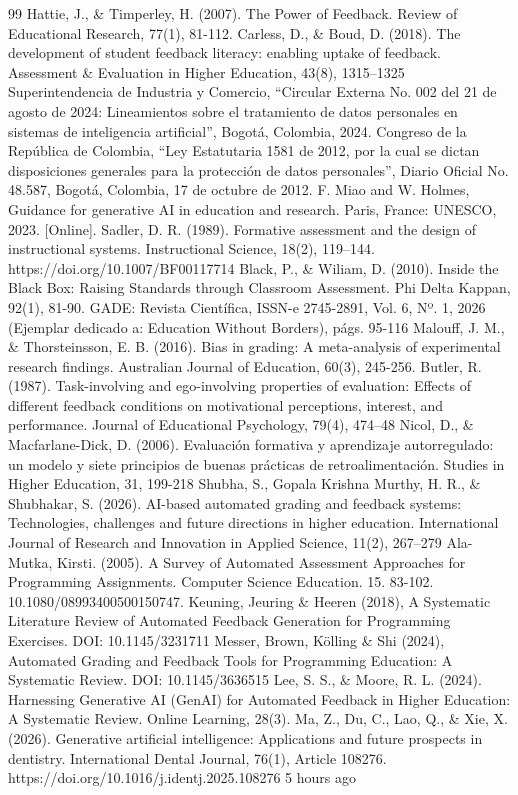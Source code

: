 \documentclass[letterpaper, 10 pt, conference]{ieeeconf}
\begin{document}
\begin{thebibliography}{99}
 Hattie, J., \& Timperley, H. (2007). The Power of Feedback. Review of Educational Research, 77(1), 81-112.
 Carless, D., \& Boud, D. (2018). The development of student feedback literacy: enabling uptake of feedback. Assessment \& Evaluation in Higher Education, 43(8), 1315–1325
 Superintendencia de Industria y Comercio, “Circular Externa No. 002 del 21 de agosto de 2024: Lineamientos sobre el tratamiento de datos personales en sistemas de inteligencia artificial”, Bogotá, Colombia, 2024.
 Congreso de la República de Colombia, “Ley Estatutaria 1581 de 2012, por la cual se dictan disposiciones generales para la protección de datos personales”, Diario Oficial No. 48.587, Bogotá, Colombia, 17 de octubre de 2012.
 F. Miao and W. Holmes, Guidance for generative AI in education and research. Paris, France: UNESCO, 2023. [Online].
 Sadler, D. R. (1989). Formative assessment and the design of instructional systems. Instructional Science, 18(2), 119–144. https://doi.org/10.1007/BF00117714
 Black, P., \& Wiliam, D. (2010). Inside the Black Box: Raising Standards through Classroom Assessment. Phi Delta Kappan, 92(1), 81-90.
 GADE: Revista Científica, ISSN-e 2745-2891, Vol. 6, Nº. 1, 2026 (Ejemplar dedicado a: Education Without Borders), págs. 95-116
  Malouff, J. M., \& Thorsteinsson, E. B. (2016). Bias in grading: A meta-analysis of experimental research findings. Australian Journal of Education, 60(3), 245-256.
 Butler, R. (1987). Task-involving and ego-involving properties of evaluation: Effects of different feedback conditions on motivational perceptions, interest, and performance. Journal of Educational Psychology, 79(4), 474–48
 Nicol, D., \& Macfarlane-Dick, D. (2006). Evaluación formativa y aprendizaje autorregulado: un modelo y siete principios de buenas prácticas de retroalimentación. Studies in Higher Education, 31, 199-218
 Shubha, S., Gopala Krishna Murthy, H. R., \& Shubhakar, S. (2026). AI-based automated grading and feedback systems: Technologies, challenges and future directions in higher education. International Journal of Research and Innovation in Applied Science, 11(2), 267–279
 Ala-Mutka, Kirsti. (2005). A Survey of Automated Assessment Approaches for Programming Assignments. Computer Science Education. 15. 83-102. 10.1080/08993400500150747.
 Keuning, Jeuring \& Heeren (2018), A Systematic Literature Review of Automated Feedback Generation for Programming Exercises. DOI: 10.1145/3231711
 Messer, Brown, Kölling \& Shi (2024), Automated Grading and Feedback Tools for Programming Education: A Systematic Review. DOI: 10.1145/3636515
 Lee, S. S., \& Moore, R. L. (2024). Harnessing Generative AI (GenAI) for Automated Feedback in Higher Education: A Systematic Review. Online Learning, 28(3). 
 Ma, Z., Du, C., Lao, Q., \& Xie, X. (2026). Generative artificial intelligence: Applications and future prospects in dentistry. International Dental Journal, 76(1), Article 108276. https://doi.org/10.1016/j.identj.2025.108276
5 hours ago


\end{thebibliography}
\end{document}
